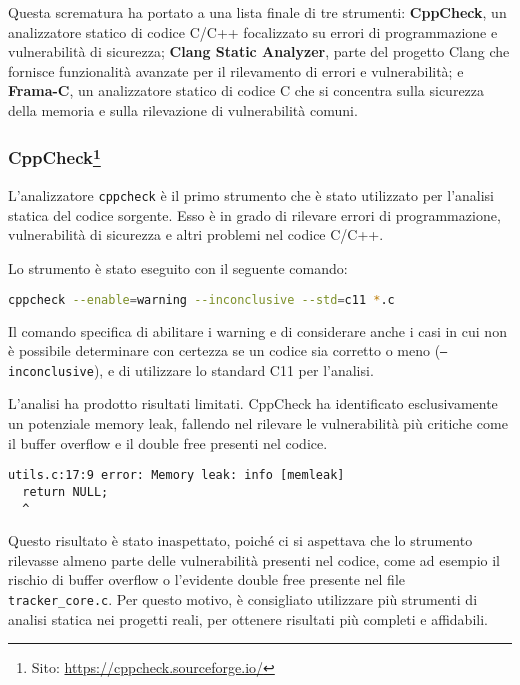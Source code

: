 Questa scrematura ha portato a una lista finale di tre strumenti: \textbf{CppCheck},
un analizzatore statico di codice C/C++ focalizzato su errori di programmazione
e vulnerabilità di sicurezza; \textbf{Clang Static Analyzer}, parte del progetto
Clang che fornisce funzionalità avanzate per il rilevamento di errori e vulnerabilità;
e \textbf{Frama-C}, un analizzatore statico di codice C che si concentra sulla
sicurezza della memoria e sulla rilevazione di vulnerabilità comuni.

\medskip
\subsubsection*{\small CppCheck\footnote{Sito: \url{https://cppcheck.sourceforge.io/}}}
L'analizzatore \texttt{cppcheck} è il primo strumento che è stato utilizzato per
l'analisi statica del codice sorgente. Esso è in grado di rilevare errori di
programmazione, vulnerabilità di sicurezza e altri problemi nel codice C/C++.

\noindent
Lo strumento è stato eseguito con il seguente comando:
\begin{lstlisting}[language=bash, numbers=none]
cppcheck --enable=warning --inconclusive --std=c11 *.c
\end{lstlisting}
Il comando specifica di abilitare i warning e di considerare anche i casi in cui
non è possibile determinare con certezza se un codice sia corretto o meno (\texttt{--inconclusive}),
e di utilizzare lo standard C11 per l'analisi.

L'analisi ha prodotto risultati limitati. CppCheck ha identificato esclusivamente
un potenziale memory leak, fallendo nel rilevare le vulnerabilità più critiche
come il buffer overflow e il double free presenti nel codice.

\begin{lstlisting}[language={}, numbers=none]
utils.c:17:9 error: Memory leak: info [memleak]
  return NULL;
  ^
\end{lstlisting}

Questo risultato è stato inaspettato, poiché ci si aspettava che lo strumento
rilevasse almeno parte delle vulnerabilità presenti nel codice, come ad esempio il
rischio di buffer overflow o l'evidente double free presente nel file \texttt{tracker\_core.c}.
Per questo motivo, è consigliato utilizzare più strumenti di analisi statica nei
progetti reali, per ottenere risultati più completi e affidabili.

\medskip

